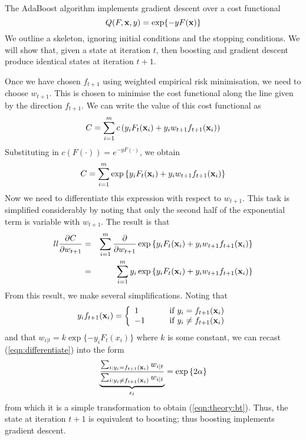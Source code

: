 \begin{theorem}
The AdaBoost algorithm implements gradient descent over a cost functional
%
\begin{equation}
Q(F, \mathbf{x}, y) = \exp \{-y F(\mathbf{x}) \}
\end{equation}
%
\proof We outline a skeleton, ignoring initial conditions and the
stopping conditions.  We will show that, given a state at iteration
$t$, then boosting and gradient descent produce identical states at
iteration $t+1$.

Once we have chosen $f_{t+1}$ using weighted empirical risk
minimisation, we need to choose $w_{t+1}$.  This is chosen to minimise
the cost functional along the line given by the direction $f_{t+1}$.
We can write the value of this cost functional as
%
\begin{equation}
C = \sum_{i=1}^{m} c \left( y_i F_t(\mathbf{x}_i) + y_i w_{t+1}
f_{t+1}(\mathbf{x}_i) \right)
\end{equation}
%
Substituting in $c(F(\cdot)) = e^{-yF(\cdot)}$, we obtain
%
\begin{equation}
C = \sum_{i=1}^{m} \exp \left\{ y_i F_t(\mathbf{x}_i) + y_i w_{t+1}
f_{t+1}(\mathbf{x}_i) \right\}
\end{equation}
%
Now we need to differentiate this expression with respect to
$w_{t+1}$.   This task is simplified considerably by noting that only
the second half of the exponential term is variable with $w_{t+1}$.
The result is that
%
\begin{eqnarray}{ll}
\label{eqn:differentiate}
\frac{\partial C}{\partial w_{t+1}} &
= & \sum_{i=1}^{m} \frac{\partial}{\partial w_{t+1}}
\exp \left\{ y_i F_t(\mathbf{x}_i) + y_i w_{t+1}
f_{t+1}(\mathbf{x}_i) \right\} \nonumber \\
& = & \sum_{i=1}^{m} y_i \exp \left\{ y_i F_t(\mathbf{x}_i) + y_i w_{t+1}
f_{t+1}(\mathbf{x}_i) \right\} 
\end{eqnarray}
%
From this result, we make several simplifications.  Noting that
%
\begin{equation}
y_i f_{t+1}(\mathbf{x}_i) = \left\{ 
	\begin{array}{ll}
	1 &	\qquad \mbox{if $y_i = f_{t+1}(\mathbf{x}_i)$} \\
	-1 &	\qquad \mbox{if $y_i \neq f_{t+1}(\mathbf{x}_i)$}
	\end{array}
\right.
\end{equation}
%
and that $w_{i | t} = k \exp \{ -y_i F_t(x_i) \}$ where $k$ is some
constant, we can recast (\ref{eqn:differentiate}) into the form
%
\begin{equation}
\underbrace{
	\frac{\sum_{i : y_i = f_{t+1}(\mathbf{x}_i)} w_{i|t}}
	     {\sum_{i : y_i \neq f_{t+1}(\mathbf{x}_i)} w_{i|t}}
}_{\epsilon_t}
= \exp \left\{ 2 \alpha \right\} 
\end{equation}
%
from which it is a simple transformation to obtain
(\ref{eqn:theory:bt}).  Thus, the state at iteration $t+1$ is
equivalent to boosting; thus boosting implements gradient descent.
\end{theorem}

